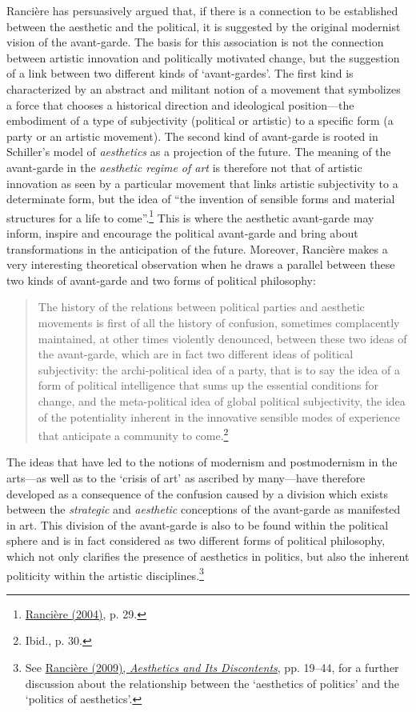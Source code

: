 Ranci\`{e}re has persuasively argued that, if there is a connection to be established between the aesthetic and the political, it is suggested by the original modernist vision of the avant-garde.  The basis for this association is not the connection between artistic innovation and politically motivated change, but the suggestion of a link between two different kinds of `avant-gardes'. The first kind is characterized by an abstract and militant notion of a movement that symbolizes a force that chooses a historical direction and ideological position---the embodiment of a type of subjectivity (political or artistic) to a specific form (a party or an artistic movement). The second kind of avant-garde is rooted in Schiller's model of \emph{aesthetics} as a projection of the future. The meaning of the avant-garde in the \emph{aesthetic regime of art} is therefore not that of artistic innovation as seen by a particular movement that links artistic subjectivity to a determinate form, but the idea of ``the invention of sensible forms and material structures for a life to come''.\footnote{\hyperlink{ranpoli}{Ranci\`{e}re (2004)}, p. 29.} This is where the aesthetic avant-garde may inform, inspire and encourage the political avant-garde and bring about transformations in the anticipation of the future. Moreover, Ranci\`{e}re makes a very interesting theoretical observation when he draws a parallel between these two kinds of avant-garde and two forms of political philosophy:
\begin{quote}
The history of the relations between political parties and aesthetic movements is first of all the history of confusion, sometimes complacently maintained, at other times violently denounced, between these two ideas of the avant-garde, which are in fact two different ideas of political subjectivity: the archi-political idea of a party, that is to say the idea of a form of political intelligence that sums up the essential conditions for change, and the meta-political idea of global political subjectivity, the idea of the potentiality inherent in the innovative sensible modes of experience that anticipate a community to come.\footnote{Ibid., p. 30.}
\end{quote}

The ideas that have led to the notions of modernism and postmodernism in the arts---as well as to the `crisis of art' as ascribed by many---have therefore developed as a consequence of the confusion caused by a division which exists between the \emph{strategic} and \emph{aesthetic} conceptions of the avant-garde as manifested in art. This division of the avant-garde is also to be found within the political sphere and is in fact considered as two different forms of political philosophy, which not only clarifies the presence of aesthetics in politics, but also the inherent politicity within the artistic disciplines.\footnote{See \hyperlink{ranaesth}{Ranci\`{e}re (2009), \emph{Aesthetics and Its Discontents}}, pp. 19--44, for a further discussion about the relationship between the `aesthetics of politics' and the `politics of aesthetics'.}

